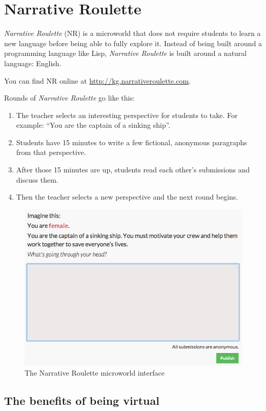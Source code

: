 \section{Narrative Roulette}

\emph{Narrative Roulette} (NR) is a microworld that does not require
students to learn a new language before being able to fully explore it.
Instead of being built around a programming language like Lisp,
\emph{Narrative Roulette} is built around a natural language: English.

You can find NR online at \url{http://kg.narrativeroulette.com}.

Rounds of \emph{Narrative Roulette} go like this: 

\begin{enumerate}
\item The teacher selects an interesting perspective for students to take. For example:
``You are the captain of a sinking ship''. 
\item Students have 15 minutes to write a few fictional, anonymous paragraphs from that perspective. 
\item After those 15 minutes are up, students read each other's
submissions and discuss them.
\item Then the teacher selects a new perspective and the next round begins. 
\end{enumerate}

\begin{figure}[ht!]
\centering
\includegraphics[width=115mm]{img/narrative_editor.png}
\caption{The Narrative Roulette microworld interface}
\label{overflow}
\end{figure}

\subsection{The benefits of being virtual}

